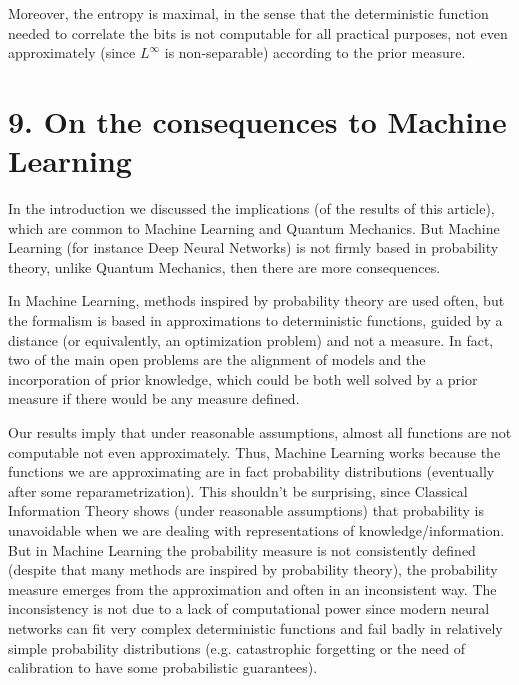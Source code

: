 \documentclass[11pt,a4paper]{report}
\begin{document}
Moreover, the entropy is maximal, in the sense that the deterministic
function needed to correlate the bits is not computable for all
practical purposes, not even approximately (since \(L^\infty\) is
non-separable) according to the prior measure.

\hypertarget{on-the-consequences-to-machine-learning}{%
\section{9. On the consequences to Machine
Learning}\label{on-the-consequences-to-machine-learning}}

In the introduction we discussed the implications (of the results of
this article), which are common to Machine Learning and Quantum
Mechanics. But Machine Learning (for instance Deep Neural Networks) is
not firmly based in probability theory, unlike Quantum Mechanics, then
there are more consequences.

In Machine Learning, methods inspired by probability theory are used
often\cite{hennig2022probabilistic}, but the formalism is based in approximations to
deterministic functions, guided by a distance (or equivalently, an
optimization problem) and not a measure. In fact, two of the main open
problems are the alignment of models and the incorporation of prior
knowledge\cite{muller2022transformers}, which could be both well solved by a prior measure if there
would be any measure defined.

Our results imply that under reasonable assumptions, almost all
functions are not computable not even approximately. Thus, Machine
Learning works because the functions we are approximating are in fact
probability distributions (eventually after some
reparametrization\cite{anonymous2023value-probability}). This shouldn't be surprising, since Classical Information
Theory shows (under reasonable assumptions) that probability is
unavoidable when we are dealing with representations of
knowledge/information\cite{novak2008tractability}\cite{hennig2022probabilistic}. But in Machine Learning the probability measure is
not consistently defined (despite that many methods are inspired by
probability theory), the probability measure emerges from the
approximation\cite{anonymous2023value-probability} and often in an inconsistent way. The inconsistency is not due to
a lack of computational power since modern neural networks can fit very
complex deterministic functions and fail
badly\cite{lakshminarayanan2017simple}\cite{degrancey:hal-03769683} in relatively simple probability distributions (e.g. catastrophic
forgetting or the need of calibration to have some probabilistic
guarantees\cite{degrancey:hal-03769683}).
\end{document}
